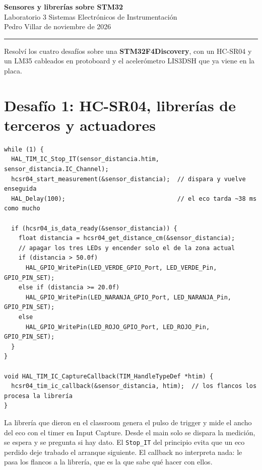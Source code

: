 \documentclass[11pt,a4paper]{article}
\begin{document}
\begin{center}
  {\large\bfseries Sensores y librerías sobre STM32}\\[2pt]
  {\small Laboratorio 3 \textbar{} Sistemas Electrónicos de Instrumentación}\\[2pt]
  {\footnotesize Pedro Villar \quad\textbar{} de noviembre de 2026}
\end{center}
\vspace{-4pt}
\hrule
\vspace{4pt}

Resolví los cuatro desafíos sobre una \textbf{STM32F4Discovery}, con un HC-SR04 y un LM35
cableados en protoboard y el acelerómetro LIS3DSH que ya viene en la placa.

\section*{Desafío 1: HC-SR04, librerías de terceros y actuadores}

\begin{lstlisting}
while (1) {
  HAL_TIM_IC_Stop_IT(sensor_distancia.htim, sensor_distancia.IC_Channel);
  hcsr04_start_measurement(&sensor_distancia);  // dispara y vuelve enseguida
  HAL_Delay(100);                               // el eco tarda ~38 ms como mucho

  if (hcsr04_is_data_ready(&sensor_distancia)) {
    float distancia = hcsr04_get_distance_cm(&sensor_distancia);
    // apagar los tres LEDs y encender solo el de la zona actual
    if (distancia > 50.0f)
      HAL_GPIO_WritePin(LED_VERDE_GPIO_Port, LED_VERDE_Pin, GPIO_PIN_SET);
    else if (distancia >= 20.0f)
      HAL_GPIO_WritePin(LED_NARANJA_GPIO_Port, LED_NARANJA_Pin, GPIO_PIN_SET);
    else
      HAL_GPIO_WritePin(LED_ROJO_GPIO_Port, LED_ROJO_Pin, GPIO_PIN_SET);
  }
}

void HAL_TIM_IC_CaptureCallback(TIM_HandleTypeDef *htim) {
  hcsr04_tim_ic_callback(&sensor_distancia, htim);  // los flancos los procesa la librería
}
\end{lstlisting}

La librería que dieron en el classroom genera el pulso de trigger y mide el ancho del
eco con el timer en Input Capture. Desde el main solo se dispara la medición, se espera y se
pregunta si hay dato. El \texttt{Stop\_IT} del principio evita que un eco perdido deje trabado
el arranque siguiente. El callback no interpreta nada: le pasa los flancos a la librería, que es
la que sabe qué hacer con ellos.
\end{document}
